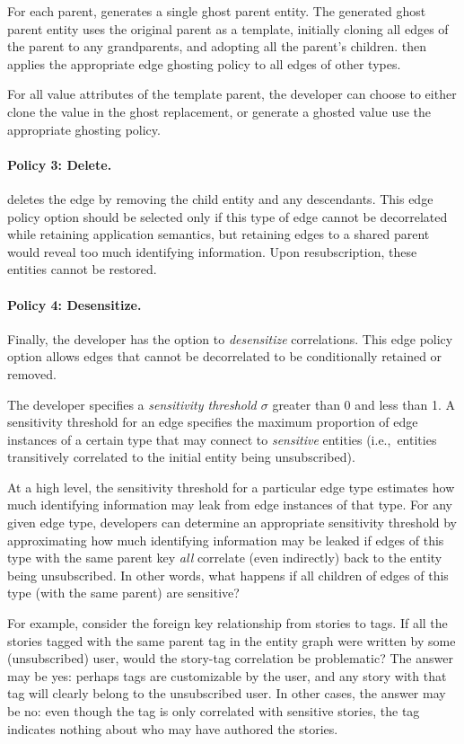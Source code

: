 For each parent, \sys generates a single ghost parent entity. The generated ghost parent
entity uses the original parent as a template, initially cloning all edges of the parent to any grandparents,
and adopting all the parent's children. \sys then applies the appropriate edge ghosting policy
to all edges of other types.

For all value attributes of the template parent, the
developer can choose to either clone the value in the ghost replacement, or generate a ghosted value
use the appropriate ghosting policy.

\paragraph{Policy 3: Delete.}
\sys deletes the edge by removing the child entity and any descendants.  This edge policy option
should be selected only if this type of edge cannot be decorrelated while retaining application
semantics, but retaining edges to a shared parent would reveal too much identifying information.
Upon resubscription, these entities cannot be restored.

\paragraph{Policy 4: Desensitize.}
Finally, the developer has the option to \emph{desensitize} correlations. This edge policy option
allows edges that cannot be decorrelated to be conditionally retained or removed.

The developer specifies a \emph{sensitivity threshold $\sigma$} greater than 0 and less than 1.  A
sensitivity threshold for an edge specifies the maximum proportion of edge instances of a certain
type that may connect to \emph{sensitive} entities (i.e.,\ entities transitively correlated to the
initial entity being unsubscribed). 

At a high level, the sensitivity threshold for a particular edge type estimates how much identifying
information may leak from edge instances of that type.  For any given edge type, developers can
determine an appropriate sensitivity threshold by approximating how much identifying information may
be leaked if edges of this type with the same parent key \emph{all} correlate (even indirectly) back
to the entity being unsubscribed. In other words, what happens if all children of edges of this type
(with the same parent) are sensitive?

For example, consider the foreign key relationship from stories to tags. If all the stories tagged
with the same parent tag in the entity graph were written by some (unsubscribed) user, would the
story-tag correlation be problematic? The answer may be yes: perhaps tags are customizable by the
user, and any story with that tag will clearly belong to the unsubscribed user. In other cases, the
answer may be no: even though the tag is only correlated with sensitive stories, the tag indicates
nothing about who may have authored the stories.

